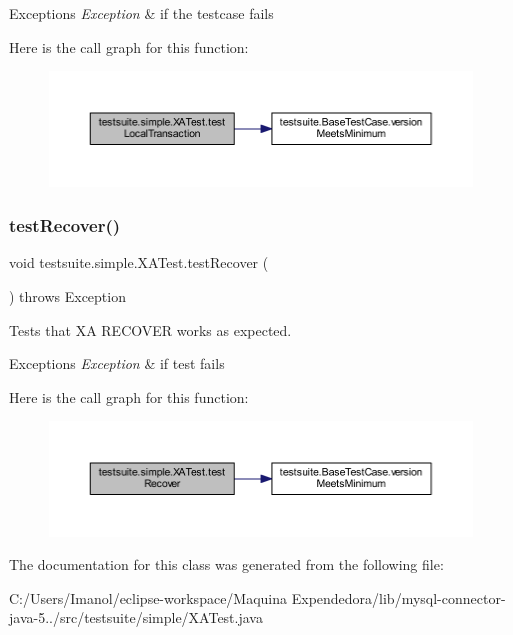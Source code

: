 \begin{DoxyExceptions}{Exceptions}
{\em Exception} & if the testcase fails \\
\hline
\end{DoxyExceptions}
Here is the call graph for this function\+:
\nopagebreak
\begin{figure}[H]
\begin{center}
\leavevmode
\includegraphics[width=350pt]{classtestsuite_1_1simple_1_1_x_a_test_aeb2dc398d807c4028e784f85aba58457_cgraph}
\end{center}
\end{figure}
\mbox{\label{classtestsuite_1_1simple_1_1_x_a_test_aa3b48d0aaeb44cc191cba70d70e16234}} 
\subsubsection{\texorpdfstring{test\+Recover()}{testRecover()}}
{\footnotesize\ttfamily void testsuite.\+simple.\+X\+A\+Test.\+test\+Recover (\begin{DoxyParamCaption}{ }\end{DoxyParamCaption}) throws Exception}

Tests that XA R\+E\+C\+O\+V\+ER works as expected.


\begin{DoxyExceptions}{Exceptions}
{\em Exception} & if test fails \\
\hline
\end{DoxyExceptions}
Here is the call graph for this function\+:
\nopagebreak
\begin{figure}[H]
\begin{center}
\leavevmode
\includegraphics[width=350pt]{classtestsuite_1_1simple_1_1_x_a_test_aa3b48d0aaeb44cc191cba70d70e16234_cgraph}
\end{center}
\end{figure}


The documentation for this class was generated from the following file\+:\begin{DoxyCompactItemize}
\item 
C\+:/\+Users/\+Imanol/eclipse-\/workspace/\+Maquina Expendedora/lib/mysql-\/connector-\/java-\/5../src/testsuite/simple/X\+A\+Test.\+java\end{DoxyCompactItemize}
